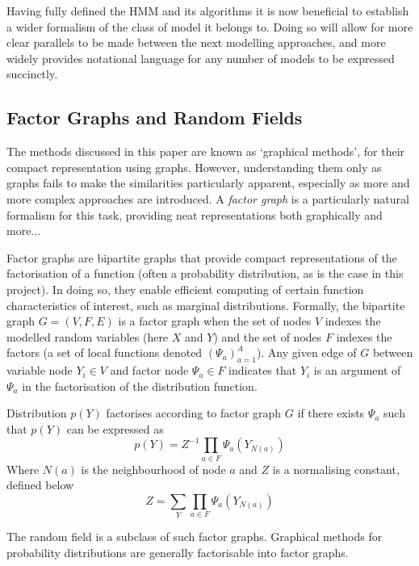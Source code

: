 \documentclass[../main.tex]{subfiles}
\begin{document}
Having fully defined the HMM and its algorithms it is now beneficial to establish a wider formalism of the class of model it belongs to.
Doing so will allow for more clear parallels to be made between the next modelling approaches, and more widely provides notational language for any number of models to be expressed succinctly.

\subsection{Factor Graphs and Random Fields}

The methods discussed in this paper are known as `graphical methods', for their compact representation using graphs.
However, understanding them only as graphs fails to make the similarities particularly apparent, especially as more and more complex approaches are introduced.
A \textit{factor graph} is a particularly natural formalism for this task, providing neat representations both graphically and more...

Factor graphs are bipartite graphs that provide compact representations of the factorisation of a function (often a probability distribution, as is the case in this project).
In doing so, they enable efficient computing of certain function characteristics of interest, such as marginal distributions.
Formally, the bipartite graph $G = (V,F,E)$ is a factor graph when the set of nodes $V$ indexes the modelled random variables (here $X$ and $Y$) and the set of nodes $F$ indexes the factors (a set of local functions denoted $( \Psi_a )_{a=1}^A$).
Any given edge of $G$ between variable node $Y_i \in V$ and factor node $\Psi_a \in F$ indicates that $Y_i$ is an argument of $\Psi_a$ in the factorisation of the distribution function.

\begin{definition}
    Distribution $p(Y)$ factorises according to factor graph $G$ if there exists $\Psi_a$ such that $p(Y)$ can be expressed as
    \begin{equation*}
        p(Y) = Z^{-1} \prod_{a \in F} \Psi_a (Y_{N(a)})
    \end{equation*}
    Where $N(a)$ is the neighbourhood of node $a$ and $Z$ is a normalising constant, defined below
    \begin{equation*}
        Z = \sum_Y \prod_{a \in F} \Psi_a (Y_{N(a)})
    \end{equation*}
\end{definition}
The random field is a subclass of such factor graphs.
Graphical methods for probability distributions are generally factorisable into factor graphs.
\end{document}
